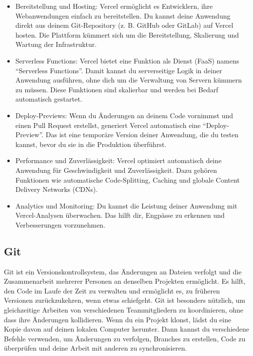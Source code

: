 \begin{itemize}
    \item Bereitstellung und Hosting: Vercel ermöglicht es Entwicklern, ihre Webanwendungen einfach zu bereitstellen. Du kannst deine Anwendung direkt aus deinem Git-Repository (z. B. GitHub oder GitLab) auf Vercel hosten. Die Plattform kümmert sich um die Bereitstellung, Skalierung und Wartung der Infrastruktur.
    \item Serverless Functions: Vercel bietet eine Funktion als Dienst (FaaS) namens “Serverless Functions”. Damit kannst du serverseitige Logik in deiner Anwendung ausführen, ohne dich um die Verwaltung von Servern kümmern zu müssen. Diese Funktionen sind skalierbar und werden bei Bedarf automatisch gestartet.
    \item Deploy-Previews: Wenn du Änderungen an deinem Code vornimmst und einen Pull Request erstellst, generiert Vercel automatisch eine “Deploy-Preview”. Das ist eine temporäre Version deiner Anwendung, die du testen kannst, bevor du sie in die Produktion überführst.
    \item Performance und Zuverlässigkeit: Vercel optimiert automatisch deine Anwendung für Geschwindigkeit und Zuverlässigkeit. Dazu gehören Funktionen wie automatische Code-Splitting, Caching und globale Content Delivery Networks (CDNs).
    \item Analytics und Monitoring: Du kannst die Leistung deiner Anwendung mit Vercel-Analysen überwachen. Das hilft dir, Engpässe zu erkennen und Verbesserungen vorzunehmen.
\end{itemize}

\subsection{ Git }

Git ist ein Versionskontrollsystem, das Änderungen an Dateien verfolgt und die Zusammenarbeit mehrerer Personen an denselben 
Projekten ermöglicht. Es hilft, den Code im Laufe der Zeit zu verwalten und ermöglicht es, zu früheren Versionen zurückzukehren,
 wenn etwas schiefgeht. Git ist besonders nützlich, um gleichzeitige Arbeiten von verschiedenen Teammitgliedern zu koordinieren,
  ohne dass ihre Änderungen kollidieren. Wenn du ein Projekt klonst, lädst du eine Kopie davon auf deinen lokalen Computer 
  herunter. Dann kannst du verschiedene Befehle verwenden, um Änderungen zu verfolgen, Branches zu erstellen, Code zu 
  überprüfen und deine Arbeit mit anderen zu synchronisieren.


